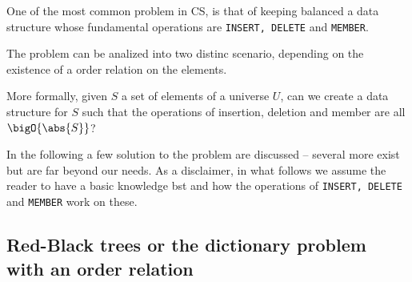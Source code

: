 \documentclass{subfiles}
\begin{document}
    One of the most common problem in CS, is that of keeping balanced a data 
        structure whose fundamental operations are \lstinline{INSERT, DELETE} and 
        \lstinline{MEMBER}.

    The problem can be analized into two distinc scenario, 
        depending on the existence of a order relation on the elements. 

    More formally, given \(S\) a set of elements of a universe \(U\),
        can we create a data structure for \(S\) such that the operations of 
        insertion, deletion and member are all \(\bigO{\abs{S}}\)?

    In the following a few solution to the problem are discussed -- 
        several more exist but are far beyond our needs.
        As a disclaimer, in what follows we assume the reader to have a basic 
        knowledge \gls{bst} and how the operations of \lstinline{INSERT, DELETE}
        and \lstinline{MEMBER} work on these.

    \subsection[Red-Black trees]{Red-Black trees or the dictionary problem with an order relation}
    
\end{document}
